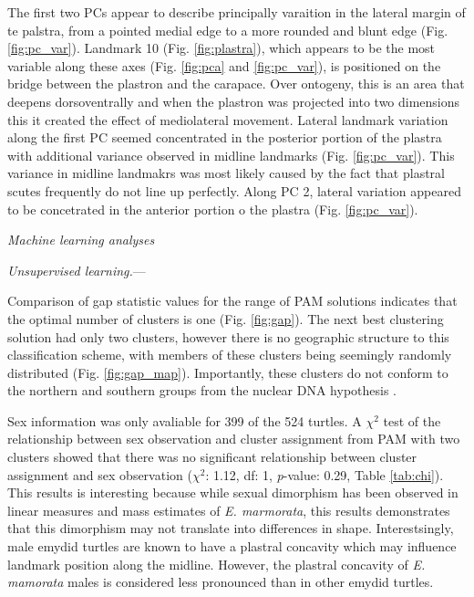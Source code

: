 \documentclass[12pt,letterpaper]{article}\usepackage{graphicx, color}
\renewcommand{\subsection}[1]{%
\bigskip
\begin{center}
\begin{large}
\normalfont\itshape #1
\end{large}
\end{center}}
\renewcommand{\subsubsection}[1]{%
\vspace{2ex}
\noindent
\textit{#1.}---}
\begin{document}
The first two PCs appear to describe principally varaition in the lateral margin of te palstra, from a pointed medial edge to a more rounded and blunt edge (Fig. \ref{fig:pc_var}). Landmark 10 (Fig. \ref{fig:plastra}), which appears to be the most variable along these axes (Fig. \ref{fig:pca} and \ref{fig:pc_var}), is positioned on the bridge between the plastron and the carapace. Over ontogeny, this is an area that deepens dorsoventrally and when the plastron was projected into two dimensions this it created the effect of mediolateral movement.
Lateral landmark variation along the first PC seemed concentrated in the posterior portion of the plastra with additional variance observed in midline landmarks (Fig. \ref{fig:pc_var}). This variance in midline landmakrs was most likely caused by the fact that plastral scutes frequently do not line up perfectly. Along PC 2, lateral variation appeared to be concetrated in the anterior portion o the plastra (Fig. \ref{fig:pc_var}).



\subsection{Machine learning analyses}
\subsubsection{Unsupervised learning}

Comparison of gap statistic values for the range of PAM solutions indicates that the optimal number of clusters is one (Fig. \ref{fig:gap}). The next best clustering solution had only two clusters, however there is no geographic structure to this classification scheme, with members of these clusters being seemingly randomly distributed (Fig. \ref{fig:gap_map}). Importantly, these clusters do not conform to the northern and southern groups from the nuclear DNA hypothesis \citep{Spinks2010}.

Sex information was only avaliable for 399 of the 524 turtles. A \(\chi^{2}\) test of the relationship between sex observation and cluster assignment from PAM with two clusters showed that there was no significant relationship between cluster assignment and sex observation (\(\chi^{2}\): 1.12, df: 1, \textit{p}-value: 0.29, Table \ref{tab:chi}). This results is interesting because while sexual dimorphism has been observed in linear measures and mass estimates of \textit{E. marmorata}, this results demonstrates that this dimorphism may not translate into differences in shape. Interestsingly, male emydid turtles are known to have a plastral concavity which may influence landmark position along the midline. However, the plastral concavity of \textit{E. mamorata} males is considered less pronounced than in other emydid turtles.
\end{document}
